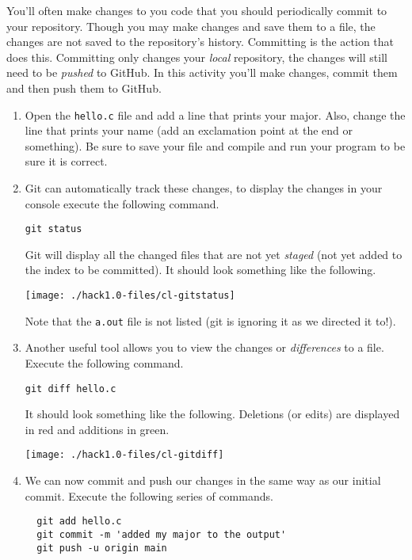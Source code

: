 \documentclass[12pt]{scrartcl}
\begin{document}
You'll often make changes to you code that you should periodically
commit to your repository.  Though you may make changes and save them to a file, 
the changes are not saved to the repository's history.  Committing is 
the action that does this.  Committing only changes your \emph{local}
repository, the changes will still need to be \emph{pushed} to GitHub.
In this activity you'll make changes, commit them and then push them
to GitHub.

\begin{enumerate}
  \item Open the \texttt{hello.c} file and add a line that
  prints your major.  Also, change the line that prints your name
  (add an exclamation point at the end or something).  Be sure to
  save your file and compile and run your program to be sure it is 
  correct.

  \item Git can automatically track these changes, to display the
  changes in your console execute the following command.
  
  \texttt{git status}
  
  Git will display all the changed files that are not yet \emph{staged}
  (not yet added to the index to be committed).  It should look
  something like the following.
  
  \begin{center}
  \texttt{[image: ./hack1.0-files/cl-gitstatus]}
  \end{center}
  
  Note that the \texttt{a.out} file is not listed (git
  is ignoring it as we directed it to!).
  
  \item Another useful tool allows you to view the changes or
  \emph{differences} to a file.  Execute the following command.
  
  \texttt{git diff hello.c}

  It should look something like the following.  Deletions (or edits)
  are displayed in red and additions in green.

  \begin{center}
  \texttt{[image: ./hack1.0-files/cl-gitdiff]}
  \end{center}
  
  \item We can now commit and push our changes in the same way
  as our initial commit.  Execute the following series of commands.
  
  \begin{verbatim}
  git add hello.c
  git commit -m 'added my major to the output'
  git push -u origin main  
  \end{verbatim}

\end{enumerate}
  
\end{document}

